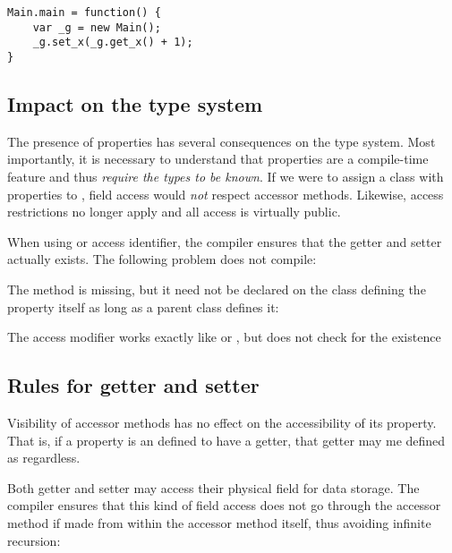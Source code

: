 \documentclass{haxe}
\begin{document}
\begin{lstlisting}
Main.main = function() {
	var _g = new Main();
	_g.set_x(_g.get_x() + 1);
}
\end{lstlisting}



\subsection{Impact on the type system}
\label{class-field-property-type-system-impact}

The presence of properties has several consequences on the type system. Most importantly, it is necessary to understand that properties are a compile-time feature and thus \emph{require the types to be known}. If we were to assign a class with properties to , field access would \emph{not} respect accessor methods. Likewise, access restrictions no longer apply and all access is virtually public.

When using  or  access identifier, the compiler ensures that the getter and setter actually exists. The following problem does not compile:


The method  is missing, but it need not be declared on the class defining the property itself as long as a parent class defines it:


The  access modifier works exactly like  or , but does not check for the existence



\subsection{Rules for getter and setter}
\label{class-field-property-rules}

Visibility of accessor methods has no effect on the accessibility of its property. That is, if a property is  an defined to have a getter, that getter may me defined as  regardless.

Both getter and setter may access their physical field for data storage. The compiler ensures that this kind of field access does not go through the accessor method if made from within the accessor method itself, thus avoiding infinite recursion:

\end{document}
